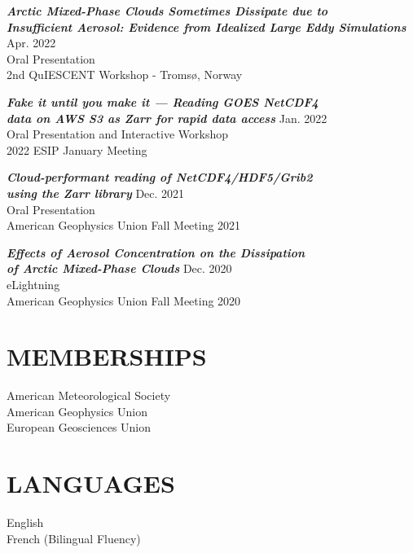 \documentclass[overlapped]{res}
\begin{document}
\begin{resume}
    {\sl \textbf{Arctic Mixed-Phase Clouds Sometimes Dissipate due to \\ Insufficient Aerosol: Evidence from Idealized Large Eddy Simulations }}\hfill Apr. 2022 \\
    Oral Presentation \\
    2nd QuIESCENT Workshop - Tromsø, Norway

    {\sl \textbf{Fake it until you make it — Reading GOES NetCDF4 \\ data on AWS S3 as Zarr for rapid data access }} \hfill Jan. 2022 \\
    Oral Presentation and Interactive Workshop\\
    2022 ESIP January Meeting

    {\sl \textbf{Cloud-performant reading of NetCDF4/HDF5/Grib2\\ using the Zarr library}} \hfill Dec. 2021 \\
    Oral Presentation \\
    American Geophysics Union Fall Meeting 2021

    {\sl \textbf{Effects of Aerosol Concentration  on the Dissipation \\ of Arctic Mixed-Phase Clouds}} \hfill Dec. 2020 \\ 
    eLightning \\
    American Geophysics Union Fall Meeting 2020
    

                

\section{MEMBERSHIPS}            
    {American Meteorological Society} \\
    {American Geophysics Union} \\
    {European Geosciences Union}

\section{LANGUAGES}
    English \\
    French (Bilingual Fluency)

\end{resume}
\end{document}
